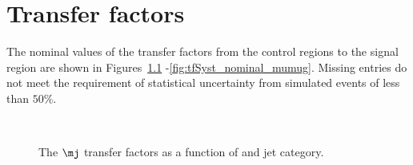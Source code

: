 \chapter{Transfer factors}
\label{app:nominal-tf}
The nominal values of the transfer factors from the control regions to the signal region are shown in Figures~\ref{fig:tfSyst_nominal_mu}
-\ref{fig:tfSyst_nominal_mumug}. Missing entries do not meet the requirement of statistical uncertainty from simulated
events of less than $50\%$.
\begin{figure}[!h]
  \centering
{}~~
\caption{\label{fig:tfSyst_nominal_mu} The $\mj$ transfer factors as a function of \scalht and jet category.}
\end{figure}

